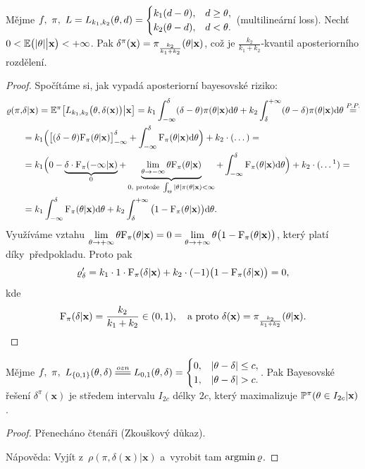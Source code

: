 \begin{theorem}\label{veta7}
	Mějme $f,~\pi,~L=L_{k_1,k_2}(\theta,d)=\begin{cases}
	k_1(d-\theta),&d\geq \theta, \\ k_2(\theta-d),& d<\theta.
	\end{cases}$ (multilineární loss). Nechť $0<\mathbb{E}\big(|\theta|\big|\textbf{x}\big)<+\infty$. Pak $\delta^\pi(\textbf{x})=\pi_{\frac{k_2}{k_1+k_2}}(\theta|\textbf{x})$, což je $\frac{k_2}{k_1+k_2}$-kvantil aposteriorního rozdělení.	
	
	\begin{proof}
		Spočítáme si, jak vypadá aposteriorní bayesovské riziko:
		\[
		\begin{split}
		\rho(\pi,&\delta|\textbf{x})=\E^{\pi}\big[L_{k_1,k_2}\big(\t,\delta(\textbf{x})\big)\big| \textbf{x}\big]=k_1\int_{-\infty}^\delta (\delta-\t)\pi(\t|\textbf{x})\d\t+k_2\int_\delta^{+\infty}(\t-\delta)\pi(\t|\textbf{x})\d\t\stackrel{P.P.}{=}\\
		&=k_1\Big(\big[(\delta-\t)\FF_\pi(\t|\textbf{x})\big]_{-\infty}^\delta+\int_{-\infty}^\delta \FF_\pi(\t|\textbf{x})\d\t\Big)+k_2\cdot (\dots)=\\
		&=k_1\Big( 0-\underbrace{\delta\cdot\FF_\pi(-\infty|\textbf{x})}_{0}+\underbrace{\lim\limits_{\t\to-\infty}\t\FF_\pi(\t|\textbf{x})}_{0\text{, protože }\int_\Theta |\t|\pi(\t|\textbf{x})<\infty}+\int_{-\infty}^\delta \FF_\pi(\t|\textbf{x})\d\t \Big)+k_2\cdot (\dots\text{\footnotemark})=\\
		&=k_1\int_{-\infty}^\delta \FF_\pi(\t|\textbf{x})\d\t+k_2\int_\delta^{+\infty}\big(1-\FF_\pi(\t|\textbf{x})\big)\d\t.
		\end{split}
		\]
		Využíváme vztahu
		$\lim\limits_{\theta\to+\infty}\theta\mathrm{F}_{\pi}(\theta|\textbf{x})=0=\lim\limits_{\theta\to+\infty}\theta\big(1-\mathrm{F}_{\pi}(\theta|\textbf{x})\big)$, který platí díky~předpokladu.			Proto pak
		$$\varrho_\delta'=k_1\cdot 1\cdot\mathrm{F}_\pi(\delta|\textbf{x})+k_2\cdot(-1)\big(1-\mathrm{F}_\pi(\delta|\textbf{x})\big)=0,$$
		kde
		$$\mathrm{F}_\pi(\delta|\textbf{x})=\frac{k_2}{k_1+k_2}\in(0,1),\quad\text{a proto } \delta(\textbf{x})=\pi_{\frac{k_2}{k_1+k_2}}(\theta|\textbf{x}).$$
		
	\end{proof} 
	
	
\end{theorem}
\begin{theorem}
	Mějme $f,~\pi,~L_{\{0,1\}}(\t,\delta)\equal{ozn}L_{0,1}(\t,\delta)=\begin{cases}
	0,&|\t-\delta|\leq c,\\1,& |\t-\delta|>c.
	\end{cases}$. Pak Bayesovské řešení $\delta^\pi(\textbf{x})$ je středem intervalu $I_{2c}$ délky $2c$, který maximalizuje $\mathbb{P}^\pi(\theta\in I_{2c}|\textbf{x})$.
	\begin{proof}
		Přenecháno čtenáři (Zkouškový důkaz).
		
		Nápověda: Vyjít z~$\rho(\pi,\delta(\textbf{x})|\textbf{x})$ a~vyrobit tam $\mathop{\mathrm{argmin}} \varrho$.
	\end{proof}
\end{theorem}
\FloatBarrier

